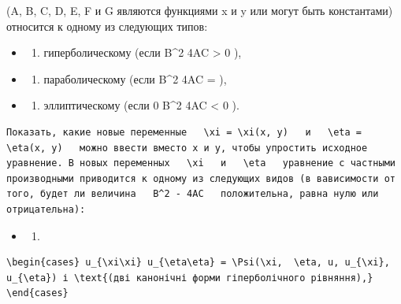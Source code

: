 \documentclass[
  ukrainian,
]{article}
\providecommand{\tightlist}{%
  \setlength{\itemsep}{0pt}\setlength{\parskip}{0pt}}
\begin{document}
(A, B, C, D, E, F и G являются функциями x и y или могут быть
константами) относится к одному из следующих типов:

\begin{itemize}
\tightlist
\item
  \begin{enumerate}
  \def\labelenumi{\arabic{enumi})}
  \tightlist
  \item
    гиперболическому (если B\^{}2 4AC \textgreater{} 0 ),
  \end{enumerate}
\item
  \begin{enumerate}
  \def\labelenumi{\arabic{enumi})}
  \setcounter{enumi}{1}
  \tightlist
  \item
    параболическому (если B\^{}2 4AC = ),
  \end{enumerate}
\item
  \begin{enumerate}
  \def\labelenumi{\arabic{enumi})}
  \setcounter{enumi}{2}
  \tightlist
  \item
    эллиптическому (если 0 B\^{}2 4AC \textless{} 0 ).
  \end{enumerate}
\end{itemize}

\begin{verbatim}
Показать, какие новые переменные   \xi = \xi(x, y)   и   \eta = \eta(x, y)   можно ввести вместо x и y, чтобы упростить исходное уравнение. В новых переменных   \xi   и   \eta   уравнение с частными производными приводится к одному из следующих видов (в вависимости от того, будет ли величина   B^2 - 4AC   положительна, равна нулю или отрицательна):
\end{verbatim}

\begin{itemize}
\tightlist
\item
  \begin{enumerate}
  \def\labelenumi{\arabic{enumi}.}
  \tightlist
  \item
  \end{enumerate}
\end{itemize}

\begin{verbatim}
\begin{cases} u_{\xi\xi} u_{\eta\eta} = \Psi(\xi,  \eta, u, u_{\xi}, u_{\eta}) і \text{(дві канонічні форми гіперболічного рівняння),} \end{cases}
\end{verbatim}
\end{document}
